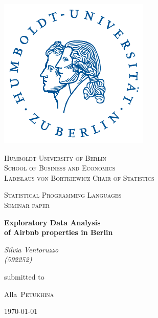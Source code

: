   \begin{center}
  
  \includegraphics[scale=0.9]{hulogo.pdf} \par\vspace{1cm}
  {\scshape\LARGE Humboldt-University of Berlin} \\
  {\scshape\Large School of Business and Economics \\
  Ladislaus von Bortkiewicz Chair of Statistics}
  \par
  \vspace{1cm}
  {\scshape\large Statistical Programming Languages \\
  \Large Seminar paper} \par
  \vspace{1.5cm}
  {\huge\bfseries Exploratory Data Analysis \\ of Airbnb properties in Berlin\par}
  \vspace{1cm}
  {\Large\itshape Silvia Ventoruzzo \\
    (592252)} \par
  \vspace{1cm}
  \vfill
  submitted to \par
  {\Large Alla~\scshape Petukhina \par}
  \vfill
  {\large \today\par}
\end{center}